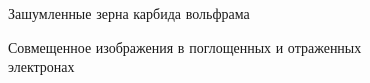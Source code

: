 \documentclass[a4paper, 14pt]{article}
\begin{document}
	\begin{figure}[h]
		\begin{center}
			\begin{minipage}[h]{0.4\linewidth}
				\caption{Зашумленные зерна карбида вольфрама}
				\label{ris:noise}
			\end{minipage}
			\hfill
			\begin{minipage}[h]{0.4\linewidth}
				\caption{Совмещенное изображения в поглощенных и отраженных электронах}
				\label{fig:combine2}
			\end{minipage}
		\end{center}
	\end{figure}
\end{document}
